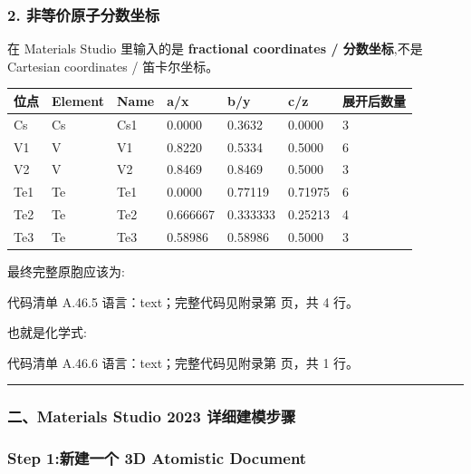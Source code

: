 \documentclass[lang=cn,scheme=chinese,color=blue,device=normal,toc=onecol,math=cm]{elegantbook}
\begin{document}
\subsubsection{2. 非等价原子分数坐标}


在 Materials Studio 里输入的是 \textbf{fractional coordinates /\allowbreak{} 分数坐标},不是 Cartesian coordinates /\allowbreak{} 笛卡尔坐标。\par


\begin{center}\small
\begin{longtable}{@{}p{} p{} p{} p{} p{} p{} p{}@{}}
\toprule
位点 & Element & Name & a/\allowbreak{}x & b/\allowbreak{}y & c/\allowbreak{}z & 展开后数量 \\
\midrule
Cs & Cs & Cs1 & 0.0000 & 0.3632 & 0.0000 & 3 \\
V1 & V & V1 & 0.8220 & 0.5334 & 0.5000 & 6 \\
V2 & V & V2 & 0.8469 & 0.8469 & 0.5000 & 3 \\
Te1 & Te & Te1 & 0.0000 & 0.77119 & 0.71975 & 6 \\
Te2 & Te & Te2 & 0.666667 & 0.333333 & 0.25213 & 4 \\
Te3 & Te & Te3 & 0.58986 & 0.58986 & 0.5000 & 3 \\
\bottomrule
\end{longtable}
\end{center}


最终完整原胞应该为:\par


\begin{codeindexbox}{代码清单 A.46.5}
语言：text；完整代码见附录第 \pageref{code:46:5} 页，共 4 行。
\end{codeindexbox}


也就是化学式:\par


\begin{codeindexbox}{代码清单 A.46.6}
语言：text；完整代码见附录第 \pageref{code:46:6} 页，共 1 行。
\end{codeindexbox}


\medskip\hrule\medskip


\subsubsection{二、Materials Studio 2023 详细建模步骤}


\subsubsection{Step 1:新建一个 3D Atomistic Document}
\end{document}
